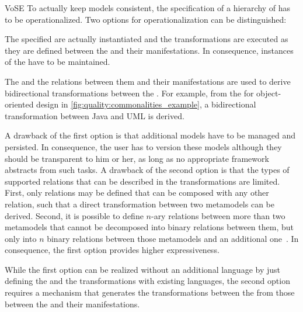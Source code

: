 \begin{copiedFrom}{VoSE}
To actually keep models consistent, the specification of a hierarchy of \conceptmetamodels has to be operationalized.
Two options for operationalization can be distinguished:

\begin{description}[leftmargin=\parindent]
    \item[\Conceptmetamodels as additional metamodels:] The specified \conceptmetamodels are actually instantiated and the transformations are executed as they are defined between the \conceptmetamodels and their manifestations. In consequence, instances of the \conceptmetamodels have to be maintained.
    \item[Transformations between \concretemetamodels:] The \conceptmetamodels and the relations between them and their manifestations are used to derive bidirectional transformations between the \concretemetamodels. For example, from the \conceptmetamodel for object-oriented design in \autoref{fig:quality:commonalities_example}, a bidirectional transformation between Java and UML is derived.
\end{description}

A drawback of the first option is that additional models have to be managed and persisted. 
In consequence, the user has to version these models although they should be transparent to him or her, as long as no appropriate framework abstracts from such tasks.
A drawback of the second option is that the types of supported relations that can be described in the transformations are limited.
First, only relations may be defined that can be composed with any other relation, such that a direct transformation between two metamodels can be derived.
Second, it is possible to define $n$-ary relations between more than two metamodels that cannot be decomposed into binary relations between them, but only into $n$ binary relations between those metamodels and an additional one~\cite{stevens2017a}.
In consequence, the first option provides higher expressiveness.

While the first option can be realized without an additional language by just defining the \conceptmetamodels and the transformations with existing languages, the second option requires a mechanism that generates the transformations between the \concretemetamodels from those between the \conceptmetamodels and their manifestations.



\end{copiedFrom}
